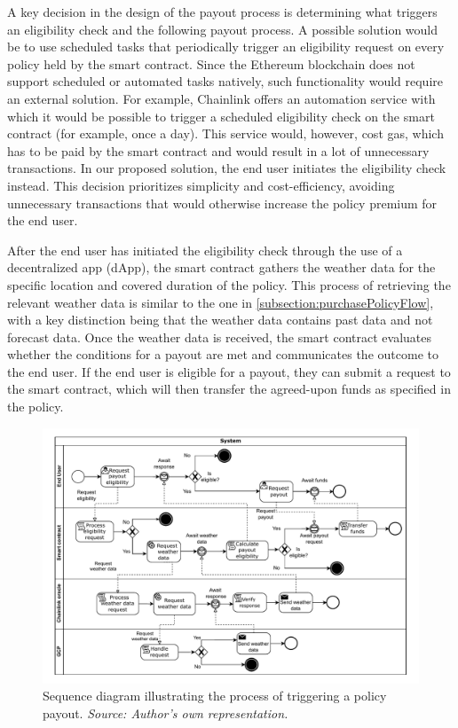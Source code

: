 A key decision in the design of the payout process is determining what triggers an eligibility check and the following payout process. A possible solution would be to use scheduled tasks that periodically trigger an eligibility request on every policy held by the smart contract. Since the Ethereum blockchain does not support scheduled or automated tasks natively, such functionality would require an external solution. For example, Chainlink offers an automation service \autocite{chainlink_automation} with which it would be possible to trigger a scheduled eligibility check on the smart contract (for example, once a day). This service would, however, cost gas, which has to be paid by the smart contract and would result in a lot of unnecessary transactions. In our proposed solution, the end user initiates the eligibility check instead. This decision prioritizes simplicity and cost-efficiency, avoiding unnecessary transactions that would otherwise increase the policy premium for the end user.

After the end user has initiated the eligibility check through the use of a decentralized app (dApp), the smart contract gathers the weather data for the specific location and covered duration of the policy. This process of retrieving the relevant weather data is similar to the one in \cref{subsection:purchasePolicyFlow}, with a key distinction being that the weather data contains past data and not forecast data. Once the weather data is received, the smart contract evaluates whether the conditions for a payout are met and communicates the outcome to the end user. If the end user is eligible for a payout, they can submit a request to the smart contract, which will then transfer the agreed-upon funds as specified in the policy.

\begin{figure}[ht]
    \centering
    \includegraphics[width=1\textwidth]{figures/flow-policy-payout-trigger.drawio.pdf}
    \caption{Sequence diagram illustrating the process of triggering a policy payout. \textit{Source: Author's own representation.}}
    \label{fig:payoutFlow}
\end{figure}

